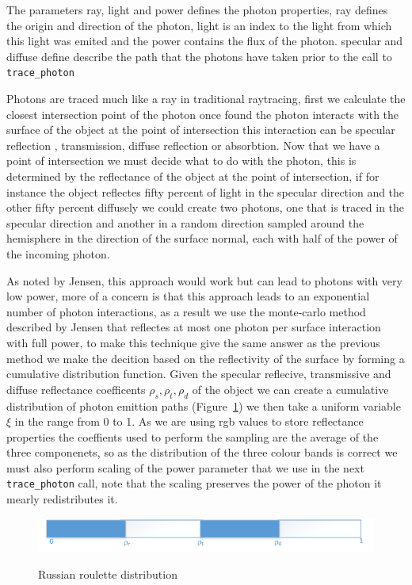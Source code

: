 The parameters ray, light and power defines the photon properties, ray defines the origin and direction of the photon, light is an index
to the light from which this light was emited and the power contains the flux of the photon. specular and diffuse
define describe the path that the photons have taken prior to the call to \texttt{trace\_photon}

Photons are traced much like a ray in traditional raytracing, first we calculate the closest intersection point of the photon
once found the photon interacts with the surface of the object at the point of intersection this interaction can be specular 
reflection , transmission, diffuse reflection or absorbtion. Now that we have a point of intersection we must decide what
to do with the photon, this is determined by the reflectance of the object at the point of intersection, if for instance the
object reflectes fifty percent of light in the specular direction and the other fifty percent diffusely we could create two
photons, one that is traced in the specular direction and another in a random direction sampled around the hemisphere in the
direction of the surface normal, each with half of the power of the incoming photon.

As noted by Jensen, this approach would work but can lead to photons with very low power, more of a concern is that this approach leads to an exponential number of
photon interactions, as a result we use the monte-carlo method described by Jensen \cite{JensenBook} that reflectes at most one photon
per surface interaction with full power, to make this technique give the same answer as the previous method we make the
decition based on the reflectivity of the surface by forming a cumulative distribution function.  
Given the specular reflecive, transmissive and diffuse reflectance coefficents $\rho_{s}, \rho_{t}, \rho_{d}$
of the object we can create a cumulative distribution of photon emittion paths (Figure~\ref{fig:rr_dist}) 
we then take a uniform variable $\xi$ in the range from 0 to 1. As we are using rgb values to store reflectance properties the
coeffients used to perform the sampling are the average of the three componenets, so as the distribution of the three
colour bands is correct we must also perform scaling of the power parameter that we use in the next \texttt{trace\_photon}
call, note that the scaling preserves the power of the photon it mearly redistributes it.

\begin{figure}[h]
\includegraphics{./images/russian_roulette_distribution.png}
\label{fig:rr_dist}
\caption{Russian roulette distribution}
\end{figure}

